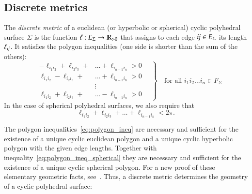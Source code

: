 \documentclass[Thesis]{subfiles}
\begin{document}

\subsection{Discrete metrics}
\label{sec:discrete_metrics}

The \emph{discrete metric} of a euclidean (or hyperbolic or spherical)
cyclic polyhedral surface $\Sigma$ is the function
$\ell:E_{\Sigma}\rightarrow\mathbb R_{>0}$ that assigns to each edge ${\it ij}
\in E_{\Sigma}$ its length $\ell_{\it ij}$.  It satisfies the polygon
inequalities (one side is shorter than the sum of the others):
\begin{equation}
\label{eq:polygon_ineq}
\left.
\quad
\begin{aligned}
-\ell_{i_{1}i_{2}}+\ell_{i_{2}i_{3}}+&\ldots+\ell_{i_{n-1}i_{n}}
>0\\
\ell_{i_{1}i_{2}}-\ell_{i_{2}i_{3}}+&\ldots+\ell_{i_{n-1}i_{n}}
>0\\
&\vdots\\
\ell_{i_{1}i_{2}}+\ell_{i_{2}i_{3}}+&\ldots-\ell_{i_{n-1}i_{n}}
>0
\end{aligned}
\quad
\right\}
\quad
\text{for all $i_{1}i_{2}\ldots i_{n}\in F_{\Sigma}$}
\end{equation}
In the case of spherical polyhedral surfaces, we also require that
\begin{equation}
  \label{eq:polygon_ineq_spherical}
  \ell_{i_{1}i_{2}}+\ell_{i_{2}i_{3}}+\ldots+\ell_{i_{n-1}i_{n}}
<2\pi.
\end{equation}

The polygon inequalities~\eqref{eq:polygon_ineq} are necessary and
sufficient for the existence of a unique cyclic euclidean polygon and
a unique cyclic hyperbolic polygon with the given edge
lengths. Together with inequality~\eqref{eq:polygon_ineq_spherical}
they are necessary and sufficient for the existence of a unique cyclic
spherical polygon. For a new proof of these elementary geometric
facts, see~\cite{KSS15}. Thus, a discrete metric determines the geometry of
a cyclic polyhedral surface:
\end{document}
